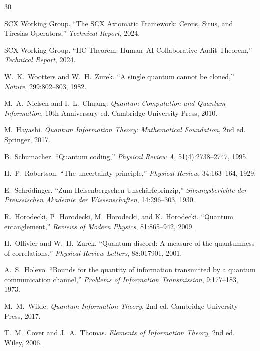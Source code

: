 \documentclass[12pt,a4paper]{article}
\begin{document}

\begin{thebibliography}{30}

SCX Working Group.
\newblock ``The SCX Axiomatic Framework: Cercis, Situs, and Tiresias
Operators,''
\newblock \emph{Technical Report}, 2024.

SCX Working Group.
\newblock ``HC-Theorem: Human--AI Collaborative Audit Theorem,''
\newblock \emph{Technical Report}, 2024.

W.~K.~Wootters and W.~H.~Zurek.
\newblock ``A single quantum cannot be cloned,''
\newblock \emph{Nature}, 299:802--803, 1982.

M.~A.~Nielsen and I.~L.~Chuang.
\newblock \emph{Quantum Computation and Quantum Information}, 10th Anniversary ed.
\newblock Cambridge University Press, 2010.

M.~Hayashi.
\newblock \emph{Quantum Information Theory: Mathematical Foundation}, 2nd ed.
\newblock Springer, 2017.

B.~Schumacher.
\newblock ``Quantum coding,''
\newblock \emph{Physical Review A}, 51(4):2738--2747, 1995.

H.~P.~Robertson.
\newblock ``The uncertainty principle,''
\newblock \emph{Physical Review}, 34:163--164, 1929.

E.~Schr\"odinger.
\newblock ``Zum Heisenbergschen Unsch\"arfeprinzip,''
\newblock \emph{Sitzungsberichte der Preussischen Akademie der Wissenschaften},
14:296--303, 1930.

R.~Horodecki, P.~Horodecki, M.~Horodecki, and K.~Horodecki.
\newblock ``Quantum entanglement,''
\newblock \emph{Reviews of Modern Physics}, 81:865--942, 2009.

H.~Ollivier and W.~H.~Zurek.
\newblock ``Quantum discord: A measure of the quantumness of correlations,''
\newblock \emph{Physical Review Letters}, 88:017901, 2001.

A.~S.~Holevo.
\newblock ``Bounds for the quantity of information transmitted by a quantum
communication channel,''
\newblock \emph{Problems of Information Transmission}, 9:177--183, 1973.

M.~M.~Wilde.
\newblock \emph{Quantum Information Theory}, 2nd ed.
\newblock Cambridge University Press, 2017.

T.~M.~Cover and J.~A.~Thomas.
\newblock \emph{Elements of Information Theory}, 2nd ed.
\newblock Wiley, 2006.

\end{thebibliography}
\end{document}
